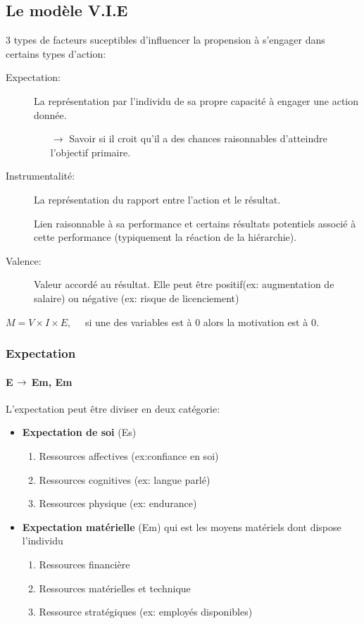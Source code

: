 \documentclass[11pt]{article} %
\begin{document}
\subsection{Le modèle V.I.E}

3 types de facteurs suceptibles d'influencer la propension à s'engager
dans certains types d'action:

\begin{description}
 \item[Expectation: ] La représentation par l'individu de sa propre
     capacité à engager une action donnée. 
     \begin{itemize}
         \item[$\to$] Savoir si il croit qu'il a des chances
             raisonnables d'atteindre l'objectif primaire.
     \end{itemize}

 \item[Instrumentalité: ] La représentation du rapport entre l'action
et le résultat.

Lien raisonnable à sa performance et certains résultats potentiels
associé à cette performance (typiquement la réaction de la
hiérarchie).

 \item[Valence: ] Valeur accordé au résultat. Elle peut être
positif(ex: augmentation de salaire) ou négative (ex: risque de
licenciement)

\end{description}

$M=V\times I \times E, \quad$ si une des variables est à 0 alors la
motivation est à 0.

\subsubsection{Expectation} 

\paragraph{\textbf{E $\bf \to$ Em, Em}}
L'expectation peut être diviser en deux catégorie:
\begin{itemize}
    \item \textbf{Expectation de soi} (Es)
	\begin{enumerate}
		\item Ressources affectives (ex:confiance en soi)
		\item Ressources cognitives (ex: langue parlé)
		\item Ressources physique (ex: endurance)
	\end{enumerate}

    \item \textbf{Expectation matérielle} (Em) qui est les moyens matériels
        dont dispose l'individu
	\begin{enumerate}
		\item Ressources financière
		\item Ressources matérielles et technique
		\item Ressource stratégiques (ex: employés disponibles)
	\end{enumerate}
\end{itemize}
\end{document}
